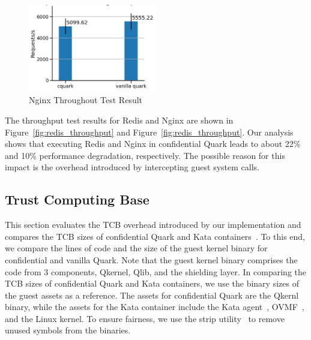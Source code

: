 \begin{figure}[!htb]
  \centering
  \includegraphics[width=0.5\textwidth]{images/nginx_throughput.PNG}
  \caption[Nginx Throughout Test]{Nginx Throughout Test Result}
  \label{fig:nginx_throughput}
\end{figure}

The throughput test results for Redis and Nginx are shown in Figure~\ref{fig:redis_throughput} and Figure~\ref{fig:redis_throughput}. Our analysis shows that executing Redis and Nginx in confidential Quark leads to about 22\% and 10\% performance degradation, respectively. 
The possible reason for this impact is the overhead introduced by intercepting guest system calls.


\subsection{Trust Computing Base}\label{tcb}

This section evaluates the TCB overhead introduced by our implementation and compares the TCB sizes of confidential Quark and Kata containers~\cite*{Kata-Containers}. To this end, we compare the lines of code and the size of the guest kernel binary for confidential and vanilla Quark. Note that the 
guest kernel binary comprises the code from 3 components, Qkernel, Qlib, and the shielding layer. In comparing the TCB sizes of confidential Quark and Kata containers, we use the binary sizes of the guest assets as a reference. The assets for confidential Quark are the Qkernl binary, while the 
assets for the Kata container include the Kata agent~\cite*{kata_agent}, OVMF~\cite*{ovmf}, and the Linux kernel. To ensure fairness, we use the strip utility~\cite*{strip} to remove unused symbols from the binaries.

